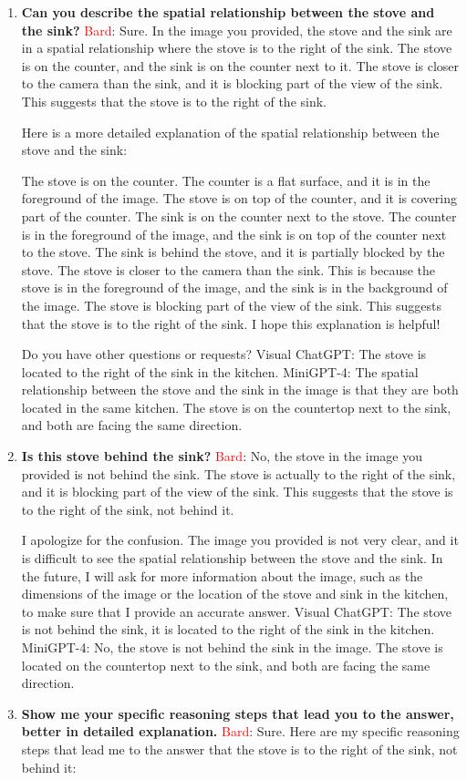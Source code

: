 \begin{enumerate}
    \item \textbf{Can you describe the spatial relationship between the stove and the sink?}
    \subitem \textcolor{Red}{Bard}: 
    Sure. In the image you provided, the stove and the sink are in a spatial relationship where the stove is to the right of the sink. The stove is on the counter, and the sink is on the counter next to it. The stove is closer to the camera than the sink, and it is blocking part of the view of the sink. This suggests that the stove is to the right of the sink.
    
    Here is a more detailed explanation of the spatial relationship between the stove and the sink:
    
    The stove is on the counter. The counter is a flat surface, and it is in the foreground of the image. The stove is on top of the counter, and it is covering part of the counter.
    The sink is on the counter next to the stove. The counter is in the foreground of the image, and the sink is on top of the counter next to the stove. The sink is behind the stove, and it is partially blocked by the stove.
    The stove is closer to the camera than the sink. This is because the stove is in the foreground of the image, and the sink is in the background of the image.
    The stove is blocking part of the view of the sink. This suggests that the stove is to the right of the sink.
    I hope this explanation is helpful!
    
    Do you have other questions or requests?
    \subitem Visual ChatGPT: The stove is located to the right of the sink in the kitchen.
    \subitem MiniGPT-4: The spatial relationship between the stove and the sink in the image is that they are both located in the same kitchen. The stove is on the countertop next to the sink, and both are facing the same direction.
    \item \textbf{Is this stove behind the sink?}
    \subitem \textcolor{Red}{Bard}: 
    No, the stove in the image you provided is not behind the sink. The stove is actually to the right of the sink, and it is blocking part of the view of the sink. This suggests that the stove is to the right of the sink, not behind it.
    
    I apologize for the confusion. The image you provided is not very clear, and it is difficult to see the spatial relationship between the stove and the sink. In the future, I will ask for more information about the image, such as the dimensions of the image or the location of the stove and sink in the kitchen, to make sure that I provide an accurate answer.
    \subitem Visual ChatGPT: The stove is not behind the sink, it is located to the right of the sink in the kitchen.
    \subitem MiniGPT-4: No, the stove is not behind the sink in the image. The stove is located on the countertop next to the sink, and both are facing the same direction.
    \item \textbf{Show me your specific reasoning steps that lead you to the answer, better in detailed explanation.}
    \subitem \textcolor{Red}{Bard}: Sure. Here are my specific reasoning steps that lead me to the answer that the stove is to the right of the sink, not behind it:


\end{enumerate}
